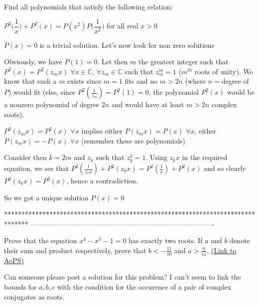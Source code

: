 \begin{solution}
	\begin{tcolorbox}Find all polynomials that satisfy the following relation:

$ P^2\bigg(\dfrac1x\bigg) + P^2(x) = P(x^2)P\bigg(\dfrac1{x^2}\bigg)$ for all real $ x > 0$\end{tcolorbox}
$ P(x)=0$ is a trivial solution. Let's now look for non zero solutions 

Obviously, we have $ P(1)=0$. Let then $ m$ the greatest integer such that $ P^2(x)=P^2(z_mx)$ $ \forall x\in\mathbb C$, $ \forall z_m\in\mathbb C$ such that $ z_m^m=1$ ($ m^{th}$ roots of unity).
We know that such a $ m$ exists since $ m=1$ fits and no $ m>2n$ (where $ n=$degree of $ P$) would fit (else, since $ P^2(\frac 1{z_m})=P^2(1)=0$, the polynomial $ P^2(x)$ would be a nonzero polynomial of degree $ 2n$ and would have at least $ m>2n$ complex roots).

$ P^2(z_mx)=P^2(x)$ $ \forall x$ implies either $ P(z_mx)=P(x)$ $ \forall x$, either $ P(z_mx)=-P(x)$ $ \forall x$ (remember these are polynomials)

Consider then $ k=2m$ and $ z_k$ such that $ z_k^k=1$. Using $ z_kx$ in the required equation, we see that $ P^2(\frac 1{z_kx})+P^2(z_kx)=P^2(\frac 1{x})+P^2(x)$ and so clearly $ P^2(z_kx)=P^2(x)$, hence a contradiction.

So we got a unique solution $ P(x)=0$
\end{solution}
*******************************************************************************
-------------------------------------------------------------------------------

\begin{problem}
	Prove that the equation $ x^4-x^3-1=0$ has exactly two roots. If $ a$ and $ b$ denote their sum and product respectively, prove that $ b<-\frac{11}{10}$ and $ a> \frac{6}{11}$.
	\flushright \href{https://artofproblemsolving.com/community/c6h309803}{(Link to AoPS)}
\end{problem}



\begin{solution}
	Can someone please post a solution for this problem?
I can't seem to link the bounds for $ a,b,c$ with the condition for the occurence of a pair of complex conjugates as roots.
\end{solution}



